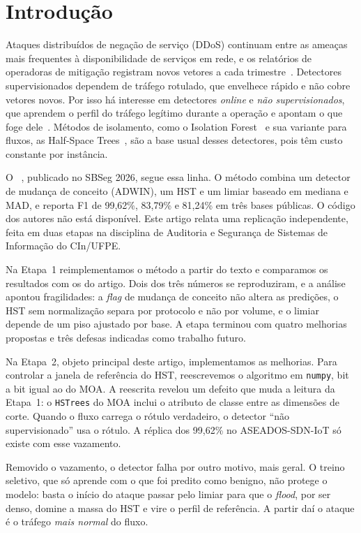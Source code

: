 \section{Introdução}
\label{sec:intro}

Ataques distribuídos de negação de serviço (DDoS) continuam entre as ameaças mais frequentes à
disponibilidade de serviços em rede, e os relatórios de operadoras de mitigação registram novos
vetores a cada trimestre~\cite{cloudflare2026}. Detectores supervisionados dependem de tráfego
rotulado, que envelhece rápido e não cobre vetores novos. Por isso há interesse em detectores
\emph{online} e \emph{não supervisionados}, que aprendem o perfil do tráfego legítimo durante a
operação e apontam o que foge dele~\cite{mirsky2018kitsune}. Métodos de isolamento, como o
Isolation Forest~\cite{liu2008iforest} e sua variante para fluxos, as Half-Space
Trees~\cite{tan2011hst}, são a base usual desses detectores, pois têm custo constante por instância.

O \modus~\cite{modus2026}, publicado no SBSeg 2026, segue essa linha. O método combina um detector
de mudança de conceito (ADWIN), um HST e um limiar baseado em mediana e MAD, e reporta F1 de
99,62\%, 83,79\% e 81,24\% em três bases públicas. O código dos autores não está disponível. Este
artigo relata uma replicação independente, feita em duas etapas na disciplina de Auditoria e
Segurança de Sistemas de Informação do CIn/UFPE.

Na Etapa~1 reimplementamos o método a partir do texto e comparamos os resultados com os do artigo.
Dois dos três números se reproduziram, e a análise apontou fragilidades: a \emph{flag} de mudança
de conceito não altera as predições, o HST sem normalização separa por protocolo e não por volume,
e o limiar depende de um piso ajustado por base. A etapa terminou com quatro melhorias propostas e
três defesas indicadas como trabalho futuro.

Na Etapa~2, objeto principal deste artigo, implementamos as melhorias. Para controlar a janela de
referência do HST, reescrevemos o algoritmo em \texttt{numpy}, bit a bit igual ao do MOA. A
reescrita revelou um defeito que muda a leitura da Etapa~1: o \texttt{HSTrees} do MOA inclui o
atributo de classe entre as dimensões de corte. Quando o fluxo carrega o rótulo verdadeiro, o
detector ``não supervisionado'' usa o rótulo. A réplica dos 99,62\% no ASEADOS-SDN-IoT só existe
com esse vazamento.

Removido o vazamento, o detector falha por outro motivo, mais geral. O treino seletivo, que só
aprende com o que foi predito como benigno, não protege o modelo: basta o início do ataque passar
pelo limiar para que o \emph{flood}, por ser denso, domine a massa do HST e vire o perfil de
referência. A partir daí o ataque é o tráfego \emph{mais normal} do fluxo.

